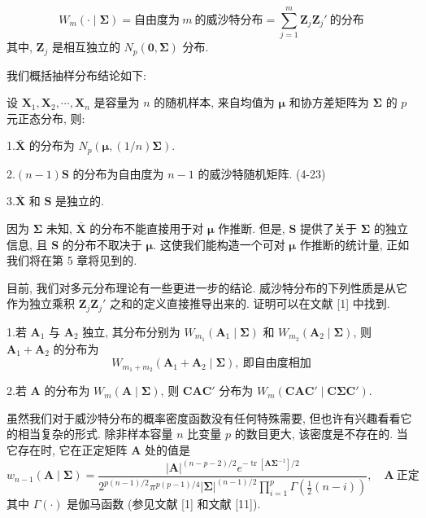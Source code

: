 \label{eq:4-22}
\begin{equation}
W_{m}(\cdot\mid\boldsymbol{\Sigma})=\text{自由度为}\ m\ \text{的威沙特分布}=\sum_{j=1}^{m}\mathbf{Z}_{j}\mathbf{Z}_{j}'\ \text{的分布} \tag{4-22}
\end{equation}
其中, $\mathbf{Z}_{j}$ 是相互独立的 $N_{p}(\mathbf{0},\boldsymbol{\Sigma})$ 分布.

我们概括抽样分布结论如下:

\begin{mvbox}
设 $\mathbf{X}_{1},\mathbf{X}_{2},\cdots,\mathbf{X}_{n}$ 是容量为 $n$ 的随机样本, 来自均值为 $\boldsymbol{\mu}$ 和协方差矩阵为 $\boldsymbol{\Sigma}$ 的 $p$ 元正态分布, 则:

1.\quad $\bar{\mathbf{X}}$ 的分布为 $N_{p}(\boldsymbol{\mu},(1/n)\boldsymbol{\Sigma})$.

2.\quad $(n-1)\mathbf{S}$ 的分布为自由度为 $n-1$ 的威沙特随机矩阵. \hfill (4-23)

3.\quad $\bar{\mathbf{X}}$ 和 $\mathbf{S}$ 是独立的.
\end{mvbox}

因为 $\boldsymbol{\Sigma}$ 未知, $\bar{\mathbf{X}}$ 的分布不能直接用于对 $\boldsymbol{\mu}$ 作推断. 但是, $\mathbf{S}$ 提供了关于 $\boldsymbol{\Sigma}$ 的独立信息, 且 $\mathbf{S}$ 的分布不取决于 $\boldsymbol{\mu}$. 这使我们能构造一个可对 $\boldsymbol{\mu}$ 作推断的统计量, 正如我们将在第 5 章将见到的.

目前, 我们对多元分布理论有一些更进一步的结论. 威沙特分布的下列性质是从它作为独立乘积 $\mathbf{Z}_{j}\mathbf{Z}_{j}'$ 之和的定义直接推导出来的. 证明可以在文献 [1] 中找到.


1.\quad 若 $\mathbf{A}_{1}$ 与 $\mathbf{A}_{2}$ 独立, 其分布分别为 $W_{m_{1}}(\mathbf{A}_{1}\mid\boldsymbol{\Sigma})$ 和 $W_{m_{2}}(\mathbf{A}_{2}\mid\boldsymbol{\Sigma})$, 则 $\mathbf{A}_{1}+\mathbf{A}_{2}$ 的分布为
\[
W_{m_{1}+m_{2}}(\mathbf{A}_{1}+\mathbf{A}_{2}\mid\boldsymbol{\Sigma}),\ \text{即自由度相加} \tag{4-24}
\]

2.\quad 若 $\mathbf{A}$ 的分布为 $W_{m}(\mathbf{A}\mid\boldsymbol{\Sigma})$, 则 $\mathbf{C}\mathbf{A}\mathbf{C}'$ 分布为 $W_{m}(\mathbf{C}\mathbf{A}\mathbf{C}'\mid\mathbf{C}\boldsymbol{\Sigma}\mathbf{C}')$.

虽然我们对于威沙特分布的概率密度函数没有任何特殊需要, 但也许有兴趣看看它的相当复杂的形式. 除非样本容量 $n$ 比变量 $p$ 的数目更大, 该密度是不存在的. 当它存在时, 它在正定矩阵 $\mathbf{A}$ 处的值是
\label{eq:4-25}
\begin{equation}
w_{n-1}(\mathbf{A}\mid\boldsymbol{\Sigma})=\frac{|\mathbf{A}|^{(n-p-2)/2}e^{-\operatorname{tr}[\mathbf{A}\boldsymbol{\Sigma}^{-1}]/2}}{2^{p(n-1)/2}\pi^{p(p-1)/4}|\boldsymbol{\Sigma}|^{(n-1)/2}\prod_{i=1}^{p}\Gamma\left(\frac{1}{2}(n-i)\right)},\quad \mathbf{A}\ \text{正定} \tag{4-25}
\end{equation}
其中 $\Gamma(\cdot)$ 是伽马函数 (参见文献 [1] 和文献 [11]).


